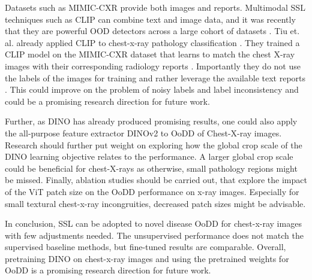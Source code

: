 Datasets such as MIMIC-CXR \citep{Johnson2019} provide both images and reports. 
Multimodal SSL techniques such as CLIP \citep{Radford2021} can combine text and image data, and it was recently that they are powerful OOD detectors across a large cohort of datasets \citep{Michels2023}.
Tiu et. al. already applied CLIP to chest-x-ray pathology classification \citep{Tiu2022}.
They trained a CLIP model on the MIMIC-CXR dataset that learns to match the chest X-ray images with their corresponding radiology reports \citep{Tiu2022}.
Importantly they do not use the labels of the images for training and rather leverage the available text reports \citep{Tiu2022}.
This could improve on the problem of noisy labels and label inconsistency and could be a promising research direction for future work.
\par
Further, as DINO has already produced promising results, one could also apply the all-purpose feature extractor DINOv2 \citep{Oquab2023} to OoDD of Chest-X-ray images. 
Research should further put weight on exploring how the global crop scale of the DINO learning objective relates to the performance.
A larger global crop scale could be beneficial for chest-X-rays as otherwise, small pathology regions might be missed.
Finally, ablation studies should be carried out, that explore the impact of the ViT patch size on the OoDD performance on x-ray images.
Especially for small textural chest-x-ray incongruities, decreased patch sizes might be advisable.
\par
In conclusion, SSL can be adopted to novel disease OoDD for chest-x-ray images with few adjustments needed.
The unsupervised performance does not match the supervised baseline methods, but fine-tuned results are comparable.
Overall, pretraining DINO on chest-x-ray images and using the pretrained weights for OoDD is a promising research direction for future work.